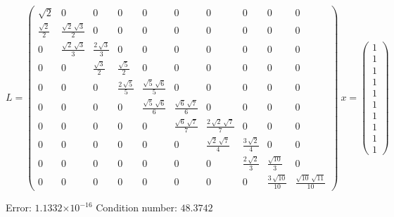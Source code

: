 \documentclass[12pt]{article}
\providecommand{\e}[1]{\ensuremath{\times 10^{#1}}}
\begin{document}
$$L=\left(\begin{array}{cccccccccc} \sqrt{2} & 0 & 0 & 0 & 0 & 0 & 0 & 0 & 0 & 0\\ \frac{\sqrt{2}}{2} & \frac{\sqrt{2}\,\sqrt{3}}{2} & 0 & 0 & 0 & 0 & 0 & 0 & 0 & 0\\ 0 & \frac{\sqrt{2}\,\sqrt{3}}{3} & \frac{2\,\sqrt{3}}{3} & 0 & 0 & 0 & 0 & 0 & 0 & 0\\ 0 & 0 & \frac{\sqrt{3}}{2} & \frac{\sqrt{5}}{2} & 0 & 0 & 0 & 0 & 0 & 0\\ 0 & 0 & 0 & \frac{2\,\sqrt{5}}{5} & \frac{\sqrt{5}\,\sqrt{6}}{5} & 0 & 0 & 0 & 0 & 0\\ 0 & 0 & 0 & 0 & \frac{\sqrt{5}\,\sqrt{6}}{6} & \frac{\sqrt{6}\,\sqrt{7}}{6} & 0 & 0 & 0 & 0\\ 0 & 0 & 0 & 0 & 0 & \frac{\sqrt{6}\,\sqrt{7}}{7} & \frac{2\,\sqrt{2}\,\sqrt{7}}{7} & 0 & 0 & 0\\ 0 & 0 & 0 & 0 & 0 & 0 & \frac{\sqrt{2}\,\sqrt{7}}{4} & \frac{3\,\sqrt{2}}{4} & 0 & 0\\ 0 & 0 & 0 & 0 & 0 & 0 & 0 & \frac{2\,\sqrt{2}}{3} & \frac{\sqrt{10}}{3} & 0\\ 0 & 0 & 0 & 0 & 0 & 0 & 0 & 0 & \frac{3\,\sqrt{10}}{10} & \frac{\sqrt{10}\,\sqrt{11}}{10} \end{array}\right)\
x=\left(\begin{array}{c} 1\\ 1\\ 1\\ 1\\ 1\\ 1\\ 1\\ 1\\ 1\\ 1 \end{array}\right)
$$

Error: $1.1332\e{-16}$ Condition number: $48.3742$
\end{document}
